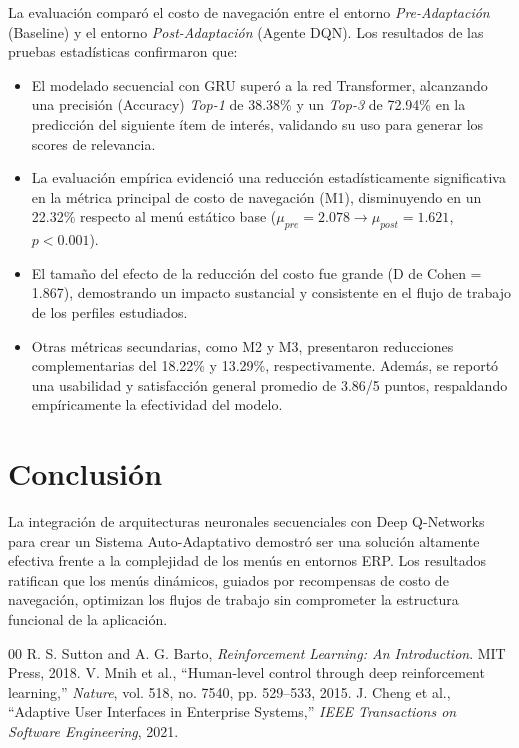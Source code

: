 \documentclass[conference]{IEEEtran}
\begin{document}
La evaluación comparó el costo de navegación entre el entorno \textit{Pre-Adaptación} (Baseline) y el entorno \textit{Post-Adaptación} (Agente DQN). Los resultados de las pruebas estadísticas confirmaron que:

\begin{itemize}
    \item El modelado secuencial con GRU superó a la red Transformer, alcanzando una precisión (Accuracy) \textit{Top-1} de 38.38\% y un \textit{Top-3} de 72.94\% en la predicción del siguiente ítem de interés, validando su uso para generar los scores de relevancia.
    \item La evaluación empírica evidenció una reducción estadísticamente significativa en la métrica principal de costo de navegación (M1), disminuyendo en un 22.32\% respecto al menú estático base ($\mu_{pre} = 2.078 \rightarrow \mu_{post} = 1.621$, $p < 0.001$).
    \item El tamaño del efecto de la reducción del costo fue grande (D de Cohen = 1.867), demostrando un impacto sustancial y consistente en el flujo de trabajo de los perfiles estudiados.
    \item Otras métricas secundarias, como M2 y M3, presentaron reducciones complementarias del 18.22\% y 13.29\%, respectivamente. Además, se reportó una usabilidad y satisfacción general promedio de 3.86/5 puntos, respaldando empíricamente la efectividad del modelo.
\end{itemize}

\section{Conclusión}
La integración de arquitecturas neuronales secuenciales con Deep Q-Networks para crear un Sistema Auto-Adaptativo demostró ser una solución altamente efectiva frente a la complejidad de los menús en entornos ERP. Los resultados ratifican que los menús dinámicos, guiados por recompensas de costo de navegación, optimizan los flujos de trabajo sin comprometer la estructura funcional de la aplicación.

\begin{thebibliography}{00}
 R. S. Sutton and A. G. Barto, \textit{Reinforcement Learning: An Introduction}. MIT Press, 2018.
 V. Mnih et al., ``Human-level control through deep reinforcement learning,'' \textit{Nature}, vol. 518, no. 7540, pp. 529--533, 2015.
 J. Cheng et al., ``Adaptive User Interfaces in Enterprise Systems,'' \textit{IEEE Transactions on Software Engineering}, 2021.
\end{thebibliography}
\end{document}
